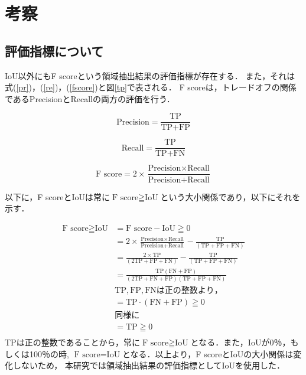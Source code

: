 \clearpage
\section{考察}
\subsection{評価指標について}
IoU以外にもF score\cite{bf}という領域抽出結果の評価指標が存在する．
また，それは式(\ref{pr})，(\ref{re})，(\ref{fscore})と図\ref{tp}で表される．
F scoreは，トレードオフの関係であるPrecisionとRecallの両方の評価を行う．

\begin{center}
\begin{equation}
  \label{pr}
  \mbox{Precision} =  \frac{\mbox{TP}}{\mbox{TP}+\mbox{FP}}　　
\end{equation}
\end{center}

\begin{center}
  \begin{equation}
    \label{re}
    \mbox{Recall} =  \frac{\mbox{TP}}{\mbox{TP}+\mbox{FN}} 
  \end{equation}
  \end{center}

\begin{center}
  \begin{equation}
    \label{fscore}
    \mbox{F score} =  2×\frac{\mbox{Precision}×\mbox{Recall}}{\mbox{Precision}+\mbox{Recall}}
  \end{equation}
\end{center}

以下に，F scoreとIoUは常に$\mbox{F score}≧\mbox{IoU}$という大小関係であり，以下にそれを示す．

\begin{align*}
  \mbox{F score}≧\mbox{IoU} &= \mbox{F score}-\mbox{IoU} ≧ 0    \\
          &= 2×\frac{\mbox{Precision}×\mbox{Recall}}{\mbox{Precision}+\mbox{Recall}}-\frac{\mbox{TP}}{(\mbox{TP}+\mbox{FP}+\mbox{FN})} \\
          &= \frac{2×\mbox{TP}}{(2\mbox{TP}+\mbox{FP}+\mbox{FN})}-\frac{\mbox{TP}}{(\mbox{TP}+\mbox{FP}+\mbox{FN})} \\
          &= \frac{\mbox{TP}(\mbox{FN}+\mbox{FP})}{(2\mbox{TP}+\mbox{FN}+\mbox{FP})(\mbox{TP}+\mbox{FP}+\mbox{FN})} \\
          &\mbox{TP},\mbox{FP},\mbox{FN}は正の整数より，\\
          &= \mbox{TP}\cdot(\mbox{FN}+\mbox{FP})≧0\\
          &同様に\\
          &= \mbox{TP}≧0 \\
\end{align*}
TPは正の整数であることから，常に$\mbox{F score}≧\mbox{IoU}$となる．また，IoUが0％，もしくは100％の時,
$\mbox{F score}=\mbox{IoU}$となる．以上より，F scoreとIoUの大小関係は変化しないため，
本研究では領域抽出結果の評価指標としてIoUを使用した．
\clearpage
